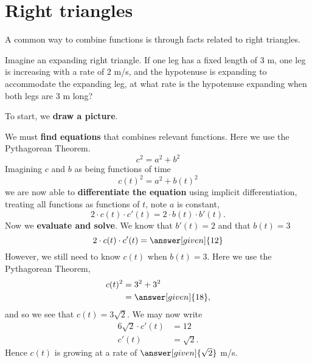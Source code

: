 \documentclass{ximera}
\begin{document}
\section{Right triangles}

A common way to combine functions is through facts related to right
triangles.


\begin{example}
  Imagine an expanding right triangle. If one leg has a fixed length
  of $3$ m, one leg is increasing with a rate of $2$ m/s, and the
  hypotenuse is expanding to accommodate the expanding leg, at what
  rate is the hypotenuse expanding when both legs are $3$ m long?
  \begin{explanation}
    To start, we \textbf{draw a picture}.
    \begin{image}
    \end{image}

    We must \textbf{find equations} that combines relevant
    functions. Here we use the Pythagorean Theorem.
    \[
    c^2 = a^2 + b^2
    \]
    Imagining $c$ and $b$ as being functions of time
    \[
    c(t)^2 = a^2 + b(t)^2
    \]
    we are now able to \textbf{differentiate the equation} using
    implicit differentiation, treating all functions as functions of
    $t$, note $a$ is constant,
    \[
    2\cdot c(t)\cdot c'(t) = 2\cdot b(t)\cdot b'(t).
    \]
    Now we \textbf{evaluate and solve}. We
    know that $b'(t) = 2$ and that $b(t) = 3$
    \[
    2\cdot c(t)\cdot c'(t) = \answer[given]{12}
    \]
    However, we still need to know $c(t)$ when $b(t) = 3$. Here we use
    the Pythagorean Theorem,
    \begin{align*}
    c(t)^2 &= 3^2 + 3^2\\
    &=\answer[given]{18},
    \end{align*}
    and so we see that $c(t) = 3\sqrt{2}$. We may now write
    \begin{align*}
      6\sqrt{2}\cdot c'(t) &= 12 \\
      c'(t) &= \sqrt{2}.
    \end{align*}
    Hence $c(t)$ is growing at a rate of $\answer[given]{\sqrt{2}}$ m/s.
  \end{explanation}
\end{example}
\end{document}
